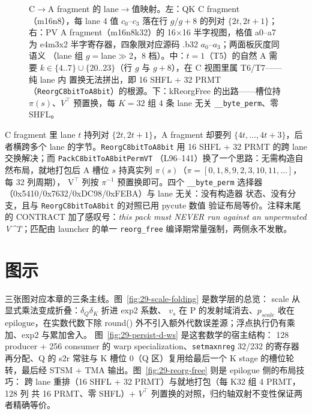 \begin{figure}[H]
\caption{C$\to$A fragment 的 lane$\to$值映射。左：QK C
fragment（m16n8），每 lane 4 值 $c_0$--$c_3$ 落在行 $g$/$g{+}8$ 的列对
$\{2t,2t{+}1\}$；右：PV A fragment（m16n8k32）的 16$\times$16 半字视图，格值
a0--a7 为 e4m3x2 半字寄存器，四象限对应源码 .b32 $a_0$--$a_3$；两面板灰度同语义
（lane 组 $g=$lane$\gg$2，8 档）。中：$t{=}1$（T5）的自然 A 需要
$k\in\{4..7\}\cup\{20..23\}$（行 $g$ 与 $g{+}8$），在 C 视图里属 T6/T7——纯 lane 内
置换无法拼出，即 16 SHFL + 32 PRMT（\texttt{ReorgC8bitToA8bit}）的根源。下：kReorgFree
的出路——槽位持 $\pi(s)$、$V^{\top}$ 预置换，每 $K{=}32$ 组 4 条 lane 无关
\texttt{\_\_byte\_perm}、零 SHFL。}
\label{fig:29-frag-map}
\end{figure}

C fragment 里 lane $t$ 持列对 $\{2t,2t{+}1\}$，A fragment 却要列
$\{4t,\dots,4t{+}3\}$，后者横跨多个 lane 的字节。\texttt{ReorgC8bitToA8bit}
用 16 SHFL + 32 PRMT 的跨 lane 交换解决；而 \texttt{PackC8bitToA8bitPermVT}
（L96--141）换了一个思路：无需构造自然布局，就地打包后 A 槽位
$s$ 持真实列 $\pi(s)$（$\pi = [0,1,8,9, 2,3,10,11,\dots]$，每 32 列周期），
V$^{\top}$ 列按 $\pi^{-1}$ 预置换即可。四个 \texttt{\_\_byte\_perm}
选择器（0x5410/0x7632/0xDC98/0xFEBA）与 lane 无关：没有构造器
状态、没有分支，且与 \texttt{ReorgC8bitToA8bit} 的对照已用 pycute 数值
验证布局等价。注释末尾的 CONTRACT 加了感叹号：\textit{this pack must
NEVER run against an unpermuted V\^{}T}；匹配由 launcher 的单一
\texttt{reorg\_free} 编译期常量强制，两侧永不发散。

\section{图示}

三张图对应本章的三条主线。图~\ref{fig:29-scale-folding} 是数学层的总览：
scale 从显式乘法变成折叠：$\delta_Q\delta_K$ 折进 exp2 系数、
$v_s$ 在 P 的发射域消去、$p_{scale}$ 收在 epilogue，在实数代数下除
round() 外不引入额外代数误差源；浮点执行仍有乘加、exp2 与累加舍入。
图~\ref{fig:29-persist-d-ws} 是这套数学的宿主结构：
128 producer + 256 consumer 的 warp specialization、\texttt{setmaxnreg}
32/232 的寄存器再分配、Q 的 s2r 常驻与 K 槽位 0（Q 区）复用给最后一个
K stage 的槽位轮转，最后经
STSM + TMA 输出。图~\ref{fig:29-reorg-free} 则是 epilogue 侧的布局技巧：
跨 lane 重排（16 SHFL + 32 PRMT）与就地打包（每 K32 组 4 PRMT，128 列
共 16 PRMT、零 SHFL）+ $V^{\top}$ 列置换的对照，归约轴双射不变性保证两者精确等价。

